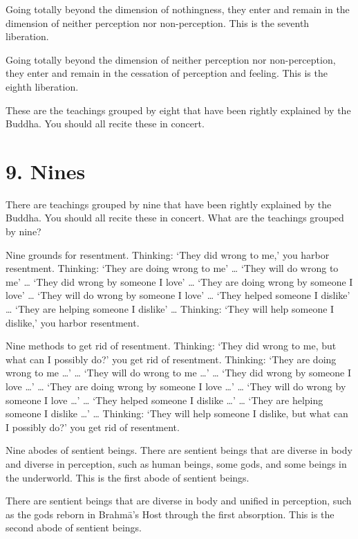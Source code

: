 \documentclass[12pt,openany]{book}%
\begin{document}
Going totally beyond the dimension of nothingness, they enter and remain in the dimension of neither perception nor non-perception. This is the seventh liberation. 

Going totally beyond the dimension of neither perception nor non-perception, they enter and remain in the cessation of perception and feeling. This is the eighth liberation. 

These are the teachings grouped by eight that have been rightly explained by the Buddha. You should all recite these in concert. 

\section*{9. Nines }

There are teachings grouped by nine that have been rightly explained by the Buddha. You should all recite these in concert. What are the teachings grouped by nine? 

Nine grounds for resentment. Thinking: ‘They did wrong to me,’ you harbor resentment. Thinking: ‘They are doing wrong to me’ … ‘They will do wrong to me’ … ‘They did wrong by someone I love’ … ‘They are doing wrong by someone I love’ … ‘They will do wrong by someone I love’ … ‘They helped someone I dislike’ … ‘They are helping someone I dislike’ … Thinking: ‘They will help someone I dislike,’ you harbor resentment. 

Nine methods to get rid of resentment. Thinking: ‘They did wrong to me, but what can I possibly do?’ you get rid of resentment. Thinking: ‘They are doing wrong to me …’ … ‘They will do wrong to me …’ … ‘They did wrong by someone I love …’ … ‘They are doing wrong by someone I love …’ … ‘They will do wrong by someone I love …’ … ‘They helped someone I dislike …’ … ‘They are helping someone I dislike …’ … Thinking: ‘They will help someone I dislike, but what can I possibly do?’ you get rid of resentment. 

Nine abodes of sentient beings. There are sentient beings that are diverse in body and diverse in perception, such as human beings, some gods, and some beings in the underworld. This is the first abode of sentient beings. 

There are sentient beings that are diverse in body and unified in perception, such as the gods reborn in \textsanskrit{Brahmā}’s Host through the first absorption. This is the second abode of sentient beings. 
\end{document}
